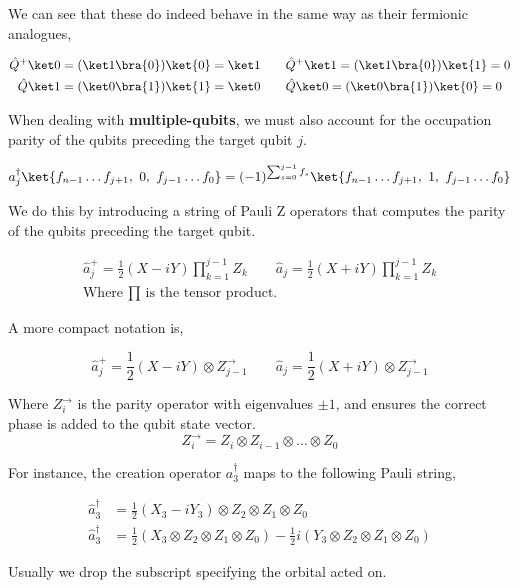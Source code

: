 We can see that these do indeed behave in the same way as their fermionic analogues,

\begin{equation*}
\begin{gathered}
    \hat Q^+ \ket 0 = (\ket 1 \bra{0})\ket{0} = \ket 1 \qquad
    \hat Q^+ \ket 1 = (\ket 1 \bra{0})\ket{1} = 0 \\
    \hat Q \ket 1 = (\ket 0 \bra{1})\ket{1} = \ket 0 \qquad
    \hat Q \ket 0 = (\ket 0 \bra{1})\ket{0} = 0
\end{gathered}
\end{equation*}

When dealing with \textbf{multiple-qubits}, we must also account for the occupation parity of the qubits preceding the target qubit $j$.

\begin{equation*}
    a_j^\dagger \ket{f_{n-1} \dots f_{j+1},\,\, 0,\,\, f_{j-1} \dots f_0} =
    (-1)^{\sum_{s=0}^{j-1} f_s}
    \ket{f_{n-1} \dots f_{j+1},\,\, 1,\,\, f_{j-1} \dots f_0}
\end{equation*}

We do this by introducing a string of Pauli Z operators that computes the parity of the qubits preceding the target qubit.

\begin{equation*}
\begin{gathered}
    \hat a_j^+ = \frac{1}{2} (X - iY) \prod_{k=1}^{j-1} Z_k \qquad
    \hat a_j = \frac{1}{2} (X + iY) \prod_{k=1}^{j-1} Z_k \\
    \text{Where $\prod$ is the tensor product.}
\end{gathered}
\end{equation*}

A more compact notation is,

\begin{equation*}
    \hat a_j^+ = \frac{1}{2} (X - iY) \otimes Z^\rightarrow_{j-1} \qquad
    \hat a_j = \frac{1}{2} (X + iY) \otimes Z^\rightarrow_{j-1}
\end{equation*}\medskip

Where $Z^\rightarrow_{i}$ is the parity operator with eigenvalues $\pm 1$, and ensures the correct phase is added to the qubit state vector.
\begin{equation*}
    Z^\rightarrow_{i} = Z_i \otimes Z_{i-1} \otimes \dots \otimes Z_0
\end{equation*}

For instance, the creation operator $a^\dagger_3$ maps to the following Pauli string,

\begin{align*}
    \hat a_3^\dagger &=
    \frac{1}{2} (X_3 - iY_3) \otimes Z_2 \otimes Z_1 \otimes Z_0 \\
    \hat a_3^\dagger &=
    \frac{1}{2} ( X_3 \otimes Z_2 \otimes Z_1 \otimes Z_0 ) -
    \frac{1}{2} i ( Y_3 \otimes Z_2 \otimes Z_1 \otimes Z_0 )
\end{align*}

Usually we drop the subscript specifying the orbital acted on.
